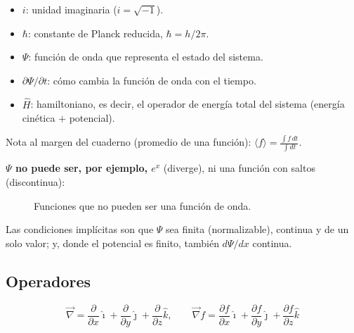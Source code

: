 \documentclass[11pt,a4paper]{article}
\newcommand{\ii}{\hat{\imath}}
\newcommand{\jj}{\hat{\jmath}}
\newcommand{\kk}{\hat{k}}
\begin{document}
\begin{enumerate}
\[  \]
  \begin{itemize}
    \item $i$: unidad imaginaria ($i=\sqrt{-1}$).
    \item $\hbar$: constante de Planck reducida, $\hbar=h/2\pi$.
    \item $\Psi$: función de onda que representa el estado del sistema.
    \item $\partial\Psi/\partial t$: cómo cambia la función de onda con el tiempo.
    \item $\hat H$: hamiltoniano, es decir, el operador de energía total del sistema (energía cinética $+$ potencial).
  \end{itemize}
\end{enumerate}

Nota al margen del cuaderno (promedio de una función): $\displaystyle\langle f\rangle=\frac{\int f\,dt}{\int dt}$.

\textbf{$\Psi$ no puede ser, por ejemplo, $e^x$} (diverge), ni una función con saltos (discontinua):
\begin{figure}[H]
\centering
{}
\caption{Funciones que no pueden ser una función de onda.}
\end{figure}

\begin{obs}
Las condiciones implícitas son que $\Psi$ sea finita (normalizable), continua y de un solo valor; y, donde el potencial
es finito, también $d\Psi/dx$ continua.
\end{obs}

\subsection{Operadores}
\[
\vec\nabla=\frac{\partial}{\partial x}\ii+\frac{\partial}{\partial y}\jj+\frac{\partial}{\partial z}\kk,\qquad
\vec\nabla f=\frac{\partial f}{\partial x}\ii+\frac{\partial f}{\partial y}\jj+\frac{\partial f}{\partial z}\kk
\]
\end{document}
